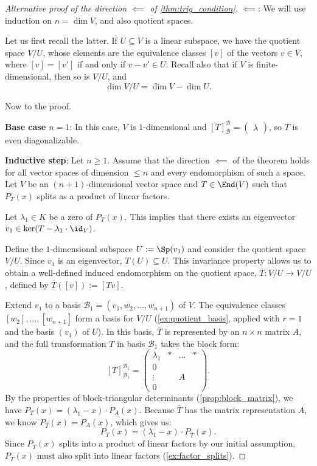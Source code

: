 \begin{proof}[Alternative proof of the direction $\impliedby$ of \cref{thm:trig_condition}]
  $\impliedby$: We will use induction on $n = \dim V$, and also quotient spaces.

  Let us first recall the latter. If $U \subseteq V$ is a linear subspace, we have the quotient space $V/U$, whose elements are the equivalence classes $[v]$ of the vectors $v \in V$, where $[v] = [v']$ if and only if $v - v' \in U$. Recall also that if $V$ is finite-di\-men\-sional, then so is $V/U$, and
  \[ \dim V/U = \dim V - \dim U. \]

  Now to the proof.

  \textbf{Base case $n=1$}: In this case, $V$ is $1$-dimensional and $[T]_{\mathcal{B}}^{\mathcal{B}} = \left(\begin{smallmatrix} \lambda \end{smallmatrix}\right)$, so $T$ is even diagonalizable.

  \textbf{Inductive step}: Let $n \ge 1$. Assume that the direction $\impliedby$ of the theorem holds for all vector spaces of dimension $\le n$ and every endomorphism of such a space.
  Let $V$ be an $(n+1)$-dimensional vector space and $T \in \End(V)$ such that $P_T(x)$ splits as a product of linear factors.

  Let $\lambda_1 \in K$ be a zero of $P_T(x)$. This implies that there exists an eigenvector $v_1 \in \ker(T - \lambda_1 \cdot \id_V)$.

  Define the $1$-dimensional subspace $U := \Sp(v_1)$ and consider the quotient space $V/U$. Since $v_1$ is an eigenvector, $T(U) \subseteq U$. This invariance property allows us to obtain a well-defined induced endomorphism on the quotient space, $\overline{T} : V/U \rightarrow V/U$, defined by $\overline{T}([v]) := [Tv]$.

  Extend $v_1$ to a basis $\mathcal{B}_1 = (v_1, w_2, \dots, w_{n+1})$ of $V$.
  The equivalence classes $[w_2], \dots, [w_{n+1}]$ form a basis for $V/U$ (\cref{ex:quotient_basis}, applied with $r = 1$ and the basis $(v_1)$ of $U$). In this basis, $\overline{T}$ is represented by an $n \times n$ matrix $A$, and the full transformation $T$ in basis $\mathcal{B}_1$ takes the block form:
  \begin{equation} \label{eq:block_matrix_induction}
    [T]_{\mathcal{B}_1}^{\mathcal{B}_1} = \left(\begin{array}{c|ccc} \lambda_1 & * & \dots & * \\ \hline 0 & & & \\ \vdots & & A & \\ 0 & & & \end{array}\right).
  \end{equation}
  By the properties of block-triangular determinants (\cref{prop:block_matrix}), we have $P_T(x) = (\lambda_1 - x) \cdot P_A(x)$. Because $\overline{T}$ has the matrix representation $A$, we know $P_{\overline{T}}(x) = P_A(x)$, which gives us:
  \[ P_T(x) = (\lambda_1 - x) \cdot P_{\overline{T}}(x). \]
  Since $P_T(x)$ splits into a product of linear factors by our initial assumption, $P_{\overline{T}}(x)$ must also split into linear factors (\cref{ex:factor_splits}).


\end{proof}

